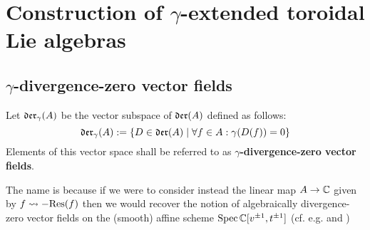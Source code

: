 \section{Construction of \texorpdfstring{$\gamma$}{}-extended toroidal Lie algebras}
    \subsection{\texorpdfstring{$\gamma$}{}-divergence-zero vector fields} \label{subsection: yangian_div_zero_vector_fields}
        \begin{definition} \label{def: yangian_div_zero_vector_fields}
            Let $\mathfrak{der}_{\gamma}(A)$ be the vector subspace of $\mathfrak{der}(A)$ defined as follows:
                $$\mathfrak{der}_{\gamma}(A) := \{ D \in \mathfrak{der}(A) \mid \forall f \in A: \gamma(D(f)) = 0 \}$$
            Elements of this vector space shall be referred to as \textbf{$\gamma$-divergence-zero vector fields}.
        \end{definition}
        \begin{remark}
            The name is because if we were to consider instead the linear map $A \to \mathbb{C}$ given by $f \leadsto -\mathrm{Res}(f)$ then we would recover the notion of algebraically divergence-zero vector fields on the (smooth) affine scheme $\operatorname{Spec} \mathbb{C}[v^{\pm 1}, t^{\pm 1}]$ (cf. e.g. \cite[Exercise 1.7c]{neher_lectures_on_EALAs} and \cite{billig_talboom_category_J_for_div_zero_vector_fields_on_tori})
        \end{remark}

